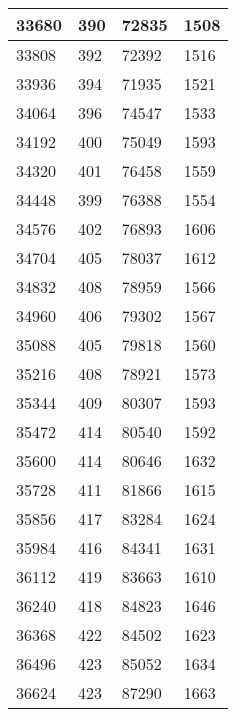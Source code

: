 \begin{longtable}{|l|l|l|l|}
		33680 & 390         & 72835           & 1508             \\ \hline
		33808 & 392         & 72392           & 1516             \\ \hline
		33936 & 394         & 71935           & 1521             \\ \hline
		34064 & 396         & 74547           & 1533             \\ \hline
		34192 & 400         & 75049           & 1593             \\ \hline
		34320 & 401         & 76458           & 1559             \\ \hline
		34448 & 399         & 76388           & 1554             \\ \hline
		34576 & 402         & 76893           & 1606             \\ \hline
		34704 & 405         & 78037           & 1612             \\ \hline
		34832 & 408         & 78959           & 1566             \\ \hline
		34960 & 406         & 79302           & 1567             \\ \hline
		35088 & 405         & 79818           & 1560             \\ \hline
		35216 & 408         & 78921           & 1573             \\ \hline
		35344 & 409         & 80307           & 1593             \\ \hline
		35472 & 414         & 80540           & 1592             \\ \hline
		35600 & 414         & 80646           & 1632             \\ \hline
		35728 & 411         & 81866           & 1615             \\ \hline
		35856 & 417         & 83284           & 1624             \\ \hline
		35984 & 416         & 84341           & 1631             \\ \hline
		36112 & 419         & 83663           & 1610             \\ \hline
		36240 & 418         & 84823           & 1646             \\ \hline
		36368 & 422         & 84502           & 1623             \\ \hline
		36496 & 423         & 85052           & 1634             \\ \hline
		36624 & 423         & 87290           & 1663             \\ \hline

\end{longtable}
